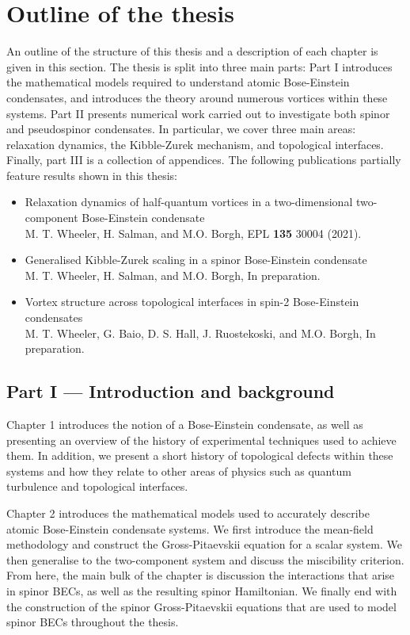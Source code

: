 \section{Outline of the thesis}
An outline of the structure of this thesis and a description of each chapter is
given in this section.
The thesis is split into three main parts: Part I introduces the mathematical
models required to understand atomic Bose-Einstein condensates, and introduces
the theory around numerous vortices within these systems.
Part II presents numerical work carried out to investigate both spinor and
pseudospinor condensates.
In particular, we cover three main areas: relaxation dynamics, the Kibble-Zurek
mechanism, and topological interfaces.
Finally, part III is a collection of appendices.
The following publications partially feature results shown in this thesis:
\begin{itemize}
    \item Relaxation dynamics of half-quantum vortices in a two-dimensional
          two-component Bose-Einstein condensate\\
          {\small M. T. Wheeler, H. Salman, and M.O. Borgh, EPL \textbf{135}
          30004 (2021).}
    \item Generalised Kibble-Zurek scaling in a spinor Bose-Einstein
          condensate\\
          {\small M. T. Wheeler, H. Salman, and M.O. Borgh, In preparation.}
    \item Vortex structure across topological interfaces in spin-2 Bose-Einstein
          condensates\\
          {\small M. T. Wheeler, G. Baio, D. S. Hall, J. Ruostekoski, and M.O.
          Borgh, In preparation.}
\end{itemize}

\subsection*{Part I --- Introduction and background}
Chapter 1 introduces the notion of a Bose-Einstein condensate, as well as
presenting an overview of the history of experimental techniques used to achieve
them.
In addition, we present a short history of topological defects within these
systems and how they relate to other areas of physics such as quantum turbulence
and topological interfaces.

Chapter 2 introduces the mathematical models used to accurately describe atomic
Bose-Einstein condensate systems.
We first introduce the mean-field methodology and construct the Gross-Pitaevskii
equation for a scalar system.
We then generalise to the two-component system and discuss the miscibility
criterion.
From here, the main bulk of the chapter is discussion the interactions that
arise in spinor BECs, as well as the resulting spinor Hamiltonian.
We finally end with the construction of the spinor Gross-Pitaevskii equations
that are used to model spinor BECs throughout the thesis.

